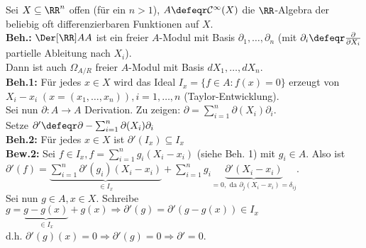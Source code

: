 \begin{nnBsp}
  Sei $X \subseteq \RR^n$ offen (für ein $n>1$), $A \defeqr
  \mathcal{C}^{\infty}(X)$ die $\RR$-Algebra der beliebig oft
  differenzierbaren Funktionen auf $X$.\\
  \textbf{Beh.:} $\Der[{\RR}]{A}{A}$ ist ein freier $A$-Modul mit
  Basis $\partial_1, \dots , \partial_n$ (mit $\partial_i \defeqr 
  \frac{\partial}{\partial X_i}$ partielle Ableitung nach $X_i$).\\
  Dann ist auch $\Omega_{A/R}$ freier $A$-Modul mit Basis $d X_1, \dots , d
  X_n$.\\
  \textbf{Beh.1:} Für jedes $x \in X$ wird das Ideal $I_x = \{ f \in A: f(x) = 0
  \}$ erzeugt von $X_i - x_i \; (x = (x_1, \dots , x_n)), i = 1 , \dots , n$
  (Taylor-Entwicklung).\\
  Sei nun $\partial: A \to A$ Derivation. Zu zeigen: $\partial = \sum_{i = 1}^n
  \partial(X_i) \partial_i$.\\
  Setze $\partial' \defeqr \partial - \sum_{i = 1}^n \partial(X_i) \partial_i$\\
  \textbf{Beh.2:} Für jedes $x \in X$ ist $\partial'(I_x) \subseteq I_x$\\
  \textbf{Bew.2:} Sei $f \in I_x, f = \sum_{i = 1}^n g_i (X_i - x_i)$ (siehe
  Beh. 1) mit $g_i \in A$. Also ist $\partial'(f) = \underset{\in
  I_x}{\underbrace{\sum_{i = 1}^n
  \partial'(g_i)(X_i - x_i)}} + \sum_{i = 1}^n g_i \underset{=0,
  \text{ da } \partial_j(X_i-x_i)=\delta_{ij}}{\underbrace{\partial'(X_i -
  x_i)}}$.\\
  Sei nun $g \in A, x \in X$.
  Schreibe $g = \underset{\in I_x}{\underbrace{g - g(x)}} + g(x) \Rightarrow
  \partial'(g) = \partial'(g - g(x)) \in I_x$\\
  d.h. $\partial'(g)(x) = 0 \Rightarrow \partial'(g) = 0 \Rightarrow \partial' =
  0$.
\end{nnBsp}

